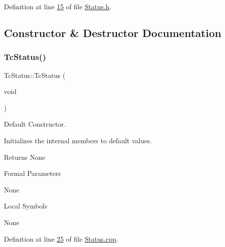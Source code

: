 Definition at line \mbox{\hyperlink{_status_8h_source_l00015}{15}} of file \mbox{\hyperlink{_status_8h_source}{Status.\+h}}.



\subsection{Constructor \& Destructor Documentation}
\mbox{\label{class_g_n_common_1_1_n_notification_1_1_tc_status_a43b5990228e5a9fbe9bfe63605f7a9d2}} 
\subsubsection{\texorpdfstring{Tc\+Status()}{TcStatus()}\hspace{0.1cm}{\footnotesize\ttfamily [1/2]}}
{\footnotesize\ttfamily Tc\+Status\+::\+Tc\+Status (\begin{DoxyParamCaption}\item[{void}]{ }\end{DoxyParamCaption})}



Default Constructor. 

Initializes the internal members to default values.

\begin{DoxyReturn}{Returns}
None
\end{DoxyReturn}
\begin{DoxyParagraph}{Formal Parameters}

\begin{DoxyPre}{\ttfamily  None }\end{DoxyPre}

\end{DoxyParagraph}
\begin{DoxyParagraph}{Local Symbols}

\begin{DoxyPre}{\ttfamily  None }\end{DoxyPre}
 
\end{DoxyParagraph}


Definition at line \mbox{\hyperlink{_status_8cpp_source_l00025}{25}} of file \mbox{\hyperlink{_status_8cpp_source}{Status.\+cpp}}.

